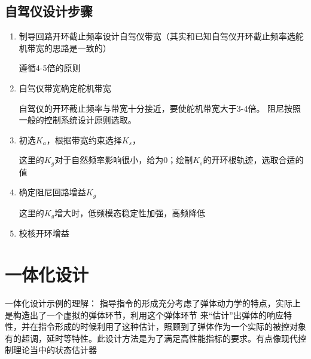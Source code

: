 \subsection{自驾仪设计步骤}
\begin{enumerate}
    \item 制导回路开环截止频率设计自驾仪带宽（其实和已知自驾仪开环截止频率选舵机带宽的思路是一致的）
    
    {\kaishu 遵循4-5倍的原则}
    \item 自驾仪带宽确定舵机带宽
    
    {\kaishu 自驾仪的开环截止频率与带宽十分接近，要使舵机带宽大于3-4倍。
    阻尼按照一般的控制系统设计原则选取。}
    \item 初选$K_a$，根据带宽约束选择$K_s$，
    
    {\kaishu 这里的$K_g$对于自然频率影响很小，给为0；绘制$K_s$的开环根轨迹，选取合适的值}
    \item 确定阻尼回路增益$K_g$
    
    {\kaishu 这里的$K_g$增大时，低频模态稳定性加强，高频降低}

    \item 校核开环增益
\end{enumerate}
\section{一体化设计}
一体化设计示例的理解：
指导指令的形成充分考虑了弹体动力学的特点，实际上是构造出了一个虚拟的弹体环节，利用这个弹体环节
来“估计”出弹体的响应特性，并在指令形成的时候利用了这种估计，照顾到了弹体作为一个实际的被控对象
有的超调，延时等特性。此设计方法是为了满足高性能指标的要求。{\kaishu 有点像现代控制理论当中的状态估计器}




